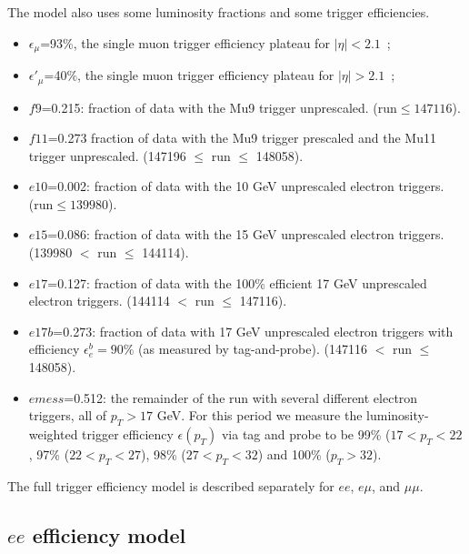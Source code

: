 The model also uses some luminosity fractions and some trigger 
efficiencies.

\begin{itemize}

\item $\epsilon_{\mu}$=93\%, the single muon trigger efficiency plateau 
for $|\eta|<2.1$~\cite{ref:evans};

\item $\epsilon'_{\mu}$=40\%, the single muon trigger efficiency plateau 
for $|\eta|>2.1$~\cite{ref:evans};

\item $f9$=0.215: fraction of data with the Mu9 trigger unprescaled.  
(run$\le 147116$).

\item $f11$=0.273 fraction of data with the Mu9 trigger prescaled and
the Mu11 trigger unprescaled.
(147196 $\leq$ run $\leq$ 148058).

\item $e10$=0.002: fraction of data with the 10 GeV unprescaled electron triggers.
(run$\le 139980$).

\item $e15$=0.086: fraction of data with the 15 GeV unprescaled electron triggers.
(139980 $<$ run $\leq$ 144114).

\item $e17$=0.127: fraction of data with the 100\% efficient 17 GeV unprescaled electron triggers.
(144114 $<$ run $\leq$ 147116).

\item $e17b$=0.273: fraction of data with 17 GeV unprescaled electron triggers
with efficiency $\epsilon_e^b=90\%$ (as measured by tag-and-probe).
(147116 $<$ run $\leq$ 148058).

\item $emess$=0.512: the remainder of the run with several different electron
triggers, all of $p_T>17$ GeV.  For this period we measure the 
luminosity-weighted
trigger efficiency $\epsilon(p_T)$ via tag and probe to be 99\% 
($17<p_T<22$, 97\% ($22<p_T<27$), 98\% ($27<p_T<32$) and
100\% ($p_T>32$).

\end{itemize}

The full trigger efficiency model is described separately for 
$ee$, $e\mu$, and $\mu\mu$.

\subsection{$ee$ efficiency model}
\label{sec:eemodel}

